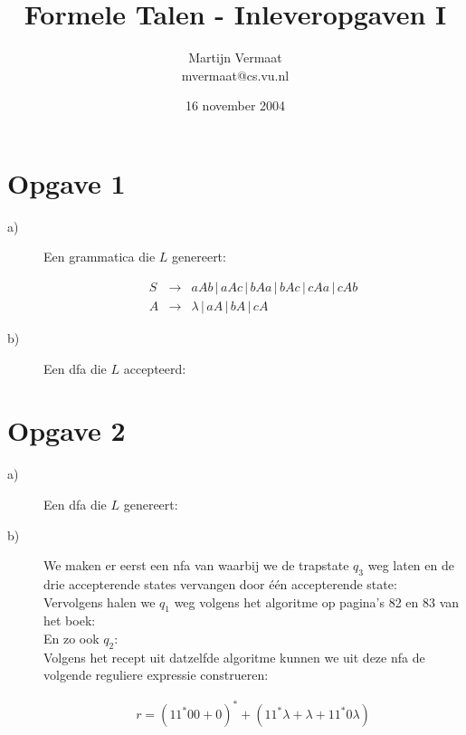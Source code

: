 \documentclass[a4paper,11pt]{article}
\title{Formele Talen - Inleveropgaven I}
\author{
    Martijn Vermaat\\
    mvermaat@cs.vu.nl
}
\date{16 november 2004}
\begin{document}
\maketitle


\section*{Opgave 1}


\begin{description}


\item[a)]

Een grammatica die $L$ genereert:

\begin{eqnarray*}
S & \rightarrow & aAb \, | \, aAc \, | \, bAa \, | \, bAc \, | \, cAa \, | \, cAb \nonumber \\
A & \rightarrow & \lambda \, | \, aA \, | \, bA \, | \, cA \nonumber
\end{eqnarray*}

\item[b)]

Een dfa die $L$ accepteerd:\\[1em]




\end{description}


\section*{Opgave 2}


\begin{description}


\item[a)]

Een dfa die $L$ genereert:\\[1em]



\item[b)]

We maken er eerst een nfa van waarbij we de trapstate $q_{3}$ weg laten en
de drie accepterende states vervangen door \'e\'en accepterende state:\\[1em]



Vervolgens halen we $q_{1}$ weg volgens het algoritme op pagina's 82 en 83
van het boek:\\[1em]



En zo ook $q_{2}$:\\[1em]



Volgens het recept uit datzelfde algoritme kunnen we uit deze nfa de
volgende reguliere expressie construeren:

\begin{eqnarray*}
r = (11^{*}00 + 0)^{*} + (11^{*}\lambda + \lambda + 11^{*}0\lambda)
\end{eqnarray*}


\end{description}
\end{document}
